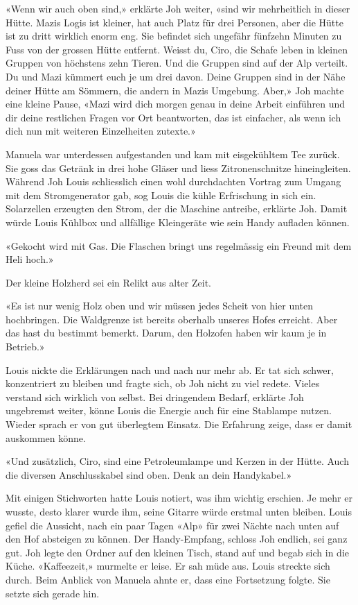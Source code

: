 «Wenn wir auch oben sind,» erklärte Joh weiter, «sind wir mehrheitlich
in dieser Hütte. Mazis Logis ist kleiner, hat auch Platz für drei
Personen, aber die Hütte ist zu dritt wirklich enorm eng. Sie befindet
sich ungefähr fünfzehn Minuten zu Fuss von der grossen Hütte entfernt.
Weisst du, Ciro, die Schafe leben in kleinen Gruppen von höchstens zehn
Tieren. Und die Gruppen sind auf der Alp verteilt. Du und Mazi kümmert
euch je um drei davon. Deine Gruppen sind in der Nähe deiner Hütte am
Sömmern, die andern in Mazis Umgebung. Aber,» Joh machte eine kleine
Pause, «Mazi wird dich morgen genau in deine Arbeit einführen und dir
deine restlichen Fragen vor Ort beantworten, das ist einfacher, als wenn
ich dich nun mit weiteren Einzelheiten zutexte.»

Manuela war unterdessen aufgestanden und kam mit eisgekühltem Tee
zurück. Sie goss das Getränk in drei hohe Gläser und liess
Zitronenschnitze hineingleiten.
Während Joh Louis schliesslich einen wohl durchdachten Vortrag zum
Umgang mit dem Stromgenerator gab, sog Louis die kühle Erfrischung in
sich ein. Solarzellen erzeugten den Strom, der die Maschine antreibe, erklärte Joh.
Damit würde Louis Kühlbox und allfällige Kleingeräte wie sein Handy
aufladen können.

«Gekocht wird mit Gas. Die Flaschen bringt uns regelmässig ein Freund
mit dem Heli hoch.»

Der kleine Holzherd sei ein Relikt aus alter Zeit.

«Es ist nur wenig Holz oben und wir müssen jedes Scheit von hier unten
hochbringen. Die Waldgrenze ist bereits oberhalb unseres Hofes erreicht.
Aber das hast du bestimmt bemerkt. Darum, den Holzofen haben wir kaum je
in Betrieb.»

Louis nickte die Erklärungen nach und nach nur mehr ab. Er tat sich
schwer, konzentriert zu bleiben und fragte sich, ob Joh nicht zu viel
redete. Vieles verstand sich wirklich von selbst.
Bei dringendem Bedarf, erklärte Joh ungebremst weiter, könne Louis die
Energie auch für eine Stablampe nutzen. Wieder sprach er von gut
überlegtem Einsatz. Die Erfahrung zeige, dass er damit auskommen könne.

«Und zusätzlich, Ciro, sind eine Petroleumlampe und Kerzen in der Hütte.
Auch die diversen Anschlusskabel sind oben. Denk an dein Handykabel.»

Mit einigen Stichworten hatte Louis notiert, was ihm wichtig erschien. 
Je mehr er wusste, desto klarer wurde ihm, seine Gitarre würde erstmal
unten bleiben. Louis gefiel die Aussicht, nach ein paar Tagen «Alp» für
zwei Nächte nach unten auf den Hof absteigen zu können.
Der Handy-Empfang, schloss Joh endlich, sei ganz gut. Joh legte den
Ordner auf den kleinen Tisch, stand auf und begab sich in die Küche.
«Kaffeezeit,» murmelte er leise. Er sah müde aus.
Louis streckte sich durch. Beim Anblick von Manuela ahnte er, dass eine Fortsetzung folgte. Sie setzte sich gerade hin.

